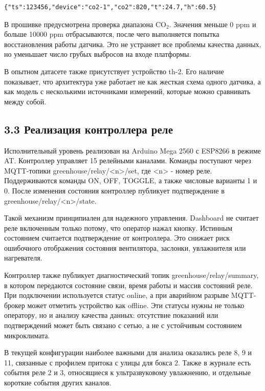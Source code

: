\documentclass[a4paper,14pt]{extarticle}
\renewcommand{\texttt}[1]{\textnormal{#1}}
\begin{document}
\begin{verbatim}
{"ts":123456,"device":"co2-1","co2":820,"t":24.7,"h":60.5}
\end{verbatim}

В прошивке предусмотрена проверка диапазона CO\(_2\). Значения меньше 0
ppm и больше 10000 ppm отбрасываются, после чего выполняется попытка
восстановления работы датчика. Это не устраняет все проблемы качества
данных, но уменьшает число грубых выбросов на входе платформы.

В опытном датасете также присутствует устройство \texttt{th-2}. Его
наличие показывает, что архитектура уже работает не как жесткая схема
одного датчика, а как модель с несколькими источниками измерений,
которые можно сравнивать между собой.

\subsection{3.3 Реализация контроллера
реле}\label{ux440ux435ux430ux43bux438ux437ux430ux446ux438ux44f-ux43aux43eux43dux442ux440ux43eux43bux43bux435ux440ux430-ux440ux435ux43bux435}

Исполнительный уровень реализован на Arduino Mega 2560 с ESP8266 в
режиме AT. Контроллер управляет 15 релейными каналами. Команды поступают
через MQTT-топики
\texttt{greenhouse/relay/\textless{}n\textgreater{}/set}, где
\texttt{\textless{}n\textgreater{}} - номер реле. Поддерживаются команды
\texttt{ON}, \texttt{OFF}, \texttt{TOGGLE}, а также числовые варианты
\texttt{1} и \texttt{0}. После изменения состояния контроллер публикует
подтверждение в
\texttt{greenhouse/relay/\textless{}n\textgreater{}/state}.

Такой механизм принципиален для надежного управления. Dashboard не
считает реле включенным только потому, что оператор нажал кнопку.
Истинным состоянием считается подтверждение от контроллера. Это снижает
риск ошибочного отображения состояния вентилятора, заслонки, увлажнителя
или нагревателя.

Контроллер также публикует диагностический топик
\texttt{greenhouse/relay/summary}, в котором передаются состояние связи,
время работы и массив состояний реле. При подключении используется
статус \texttt{online}, а при аварийном разрыве MQTT-брокер может
отметить устройство как \texttt{offline}. Эти статусы нужны не только
оператору, но и анализу качества данных: отсутствие показаний или
подтверждений может быть связано с сетью, а не с устойчивым состоянием
микроклимата.

В текущей конфигурации наиболее важными для анализа оказались реле 8, 9
и 11, связанные с профилем притока с улицы для бокса 2. Также в журнале
есть события реле 2 и 3, относящиеся к ультразвуковому увлажнению, и
отдельные короткие события других каналов.
\end{document}
